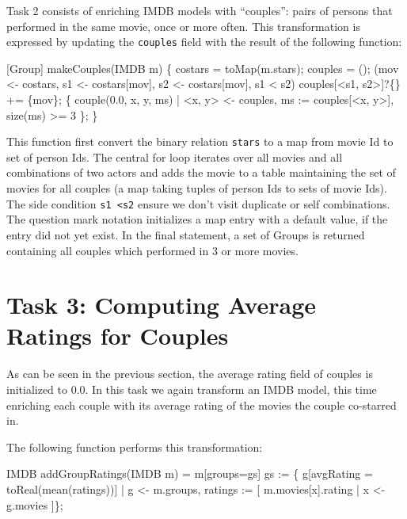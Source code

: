 \documentclass[submission,copyright,creativecommons]{eptcs}
\begin{document}
Task 2 consists of enriching IMDB models with ``couples'': pairs of persons that performed in the same movie, once or more often. This transformation is expressed by updating the \texttt{couples} field with the result of the following function:

\begin{rascal}
[Group] makeCouples(IMDB m) \{{}
    costars = toMap(m.stars); couples = ();
     (mov \textless{}- costars, s1 \textless{}- costars{}[mov], s2 \textless{}- costars{}[mov], s1 \textless{} s2) 
       couples{}[\textless{}s1, s2\textgreater{}]?\{\} += \{{}mov\}{};
     \{{} couple(0.0, x, y, ms) 
                     | \textless{}x, y\textgreater{} \textless{}- couples, ms := couples{}[\textless{}x, y\textgreater{}], size(ms) \textgreater{}= 3 \}{};
\}{}
\end{rascal}

This function first convert the binary relation \texttt{stars} to a map from movie Id to set of person Ids. The central for loop iterates over all movies and all combinations of two actors and adds the movie to a table maintaining the set of movies for all couples (a map taking tuples of person Ids to sets of movie Ids). The side condition \texttt{s1 \textless s2} ensure we don't visit duplicate or self combinations.
The question mark notation initializes a map entry with a default value, if the entry did not yet exist.
In the final statement, a set of Groups is returned containing all couples which performed in 3 or more movies.




\section{Task 3: Computing Average Ratings for Couples}

As can be seen in the previous section, the average rating field of couples is initialized to 0.0. In this task we again transform an IMDB model, this time enriching each couple with its average rating of the movies the couple co-starred in. 

The following function performs this transformation:
\begin{rascal}
IMDB addGroupRatings(IMDB m) = m{}[groups=gs]
   gs :=
    \{{} g{}[avgRating = toReal(mean(ratings))] 
       | g \textless{}- m.groups, ratings := {}[ m.movies{}[x].rating | x \textless{}- g.movies ]\}{};
\end{rascal}
\end{document}
